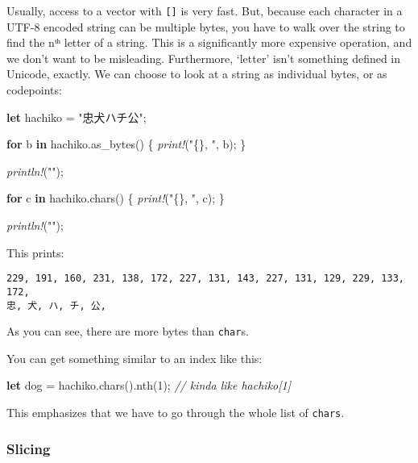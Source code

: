 \documentclass[a4paper,]{book}
\newenvironment{Shaded}{\begin{snugshade}}{\end{snugshade}}
\newcommand{\KeywordTok}[1]{\textcolor[rgb]{0.13,0.29,0.53}{\textbf{{#1}}}}
\newcommand{\DecValTok}[1]{\textcolor[rgb]{0.00,0.00,0.81}{{#1}}}
\newcommand{\StringTok}[1]{\textcolor[rgb]{0.31,0.60,0.02}{{#1}}}
\newcommand{\CommentTok}[1]{\textcolor[rgb]{0.56,0.35,0.01}{\textit{{#1}}}}
\newcommand{\PreprocessorTok}[1]{\textcolor[rgb]{0.56,0.35,0.01}{\textit{{#1}}}}
\newcommand{\NormalTok}[1]{{#1}}
\begin{document}
Usually, access to a vector with \texttt{{[}{]}} is very fast. But,
because each character in a UTF-8 encoded string can be multiple bytes,
you have to walk over the string to find the nᵗʰ letter of a string.
This is a significantly more expensive operation, and we don't want to
be misleading. Furthermore, `letter' isn't something defined in Unicode,
exactly. We can choose to look at a string as individual bytes, or as
codepoints:

\begin{Shaded}
\begin{Highlighting}[]
\KeywordTok{let} \NormalTok{hachiko = }\StringTok{"忠犬ハチ公"}\NormalTok{;}

\KeywordTok{for} \NormalTok{b }\KeywordTok{in} \NormalTok{hachiko.as_bytes() \{}
    \PreprocessorTok{print!}\NormalTok{(}\StringTok{"\{\}, "}\NormalTok{, b);}
\NormalTok{\}}

\PreprocessorTok{println!}\NormalTok{(}\StringTok{""}\NormalTok{);}

\KeywordTok{for} \NormalTok{c }\KeywordTok{in} \NormalTok{hachiko.chars() \{}
    \PreprocessorTok{print!}\NormalTok{(}\StringTok{"\{\}, "}\NormalTok{, c);}
\NormalTok{\}}

\PreprocessorTok{println!}\NormalTok{(}\StringTok{""}\NormalTok{);}
\end{Highlighting}
\end{Shaded}

This prints:

\begin{verbatim}
229, 191, 160, 231, 138, 172, 227, 131, 143, 227, 131, 129, 229, 133, 172, 
忠, 犬, ハ, チ, 公, 
\end{verbatim}

As you can see, there are more bytes than \texttt{char}s.

You can get something similar to an index like this:

\begin{Shaded}
\begin{Highlighting}[]
\KeywordTok{let} \NormalTok{dog = hachiko.chars().nth(}\DecValTok{1}\NormalTok{); }\CommentTok{// kinda like hachiko[1]}
\end{Highlighting}
\end{Shaded}

This emphasizes that we have to go through the whole list of
\texttt{chars}.

\subsubsection{Slicing}\label{slicing}
\end{document}
